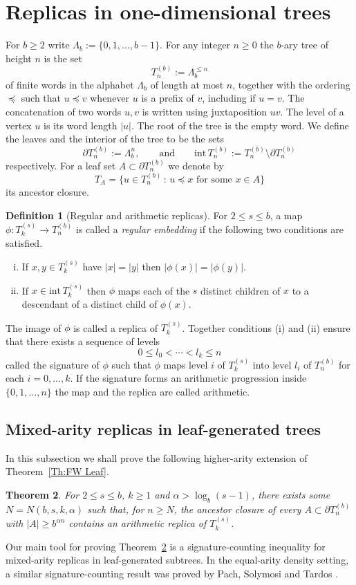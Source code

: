 \documentclass[11pt]{amsart}
\newcommand\labs[1]{\left\lvert#1\right\rvert}
\newcommand{\inte}{\mathrm{int}\,}
\renewcommand{\leq}{\leqslant}
\renewcommand{\geq}{\geqslant}
\theoremstyle{plain}
\newtheorem{thm}{Theorem}[section]
\theoremstyle{definition}
\newtheorem{defn}[thm]{Definition}
\theoremstyle{remark}
\begin{document}
\section{Replicas in one-dimensional trees}
For $b\geq 2$ write $\Lambda_b:=\{0,1,\ldots,b-1\}$. For any integer $n\geq 0$ the $b$-ary tree of height $n$ is the set
\[ T_n^{(b)} := \Lambda_b^{\leq n}\]
of finite words in the alphabet $\Lambda_b$ of length at most $n$, together with the ordering $\preceq$ such that $u\preceq v$ whenever $u$ is a prefix of $v$, including if $u=v$. The concatenation of two words $u,v$ is written using juxtaposition $uv$. The level of a vertex $u$ is its word length $\labs{u}$. The root of the tree is the empty word. We define the leaves and the interior of the tree to be the sets
\[\qquad  \partial T_n^{(b)} := \Lambda_b^{n},\qquad \text{and} \qquad \inte T_n^{(b)} := T_n^{(b)} \setminus \partial T_n^{(b)}\]  
respectively. For a leaf set $A\subset \partial T_n^{(b)}$ we denote by
\[ T_A = \{ u \in T_n^{(b)} \, : \, u \preceq x \text{ for some } x\in A\}\]
its ancestor closure.
\begin{defn}[Regular and arithmetic replicas]\label{Defn: Mixed arity replicas}
For $2\leq s \leq b$, a map $\phi: T_k^{(s)} \to T_n^{(b)}$ is called a \textit{regular embedding} if the following two conditions are satisfied.
\begin{enumerate}[(i)]
\item If $x,y\in T_k^{(s)}$ have $\labs{x} = \labs{y}$ then $\labs{\phi(x)} = \labs{\phi(y)}$.
\item If $x \in \inte T_k^{(s)}$ then $\phi$ maps each of the $s$ distinct children of $x$ to a descendant of a distinct child of $\phi(x)$.
\end{enumerate}
The image of $\phi$ is called a replica of $T_k^{(s)}$.
Together conditions (i) and (ii) ensure that there exists a sequence of levels
\[ 0 \leq l_0 < \cdots < l_k \leq n\]
called the signature of $\phi$ such that $\phi$ maps level $i$ of $T_k^{(s)}$ into level $l_i$ of $T_n^{(b)}$ for each $i=0,\ldots,k$. If the signature forms an arithmetic progression inside $\{0,1,\ldots,n\}$ the map and the replica are called arithmetic.
\end{defn}
\subsection{Mixed-arity replicas in leaf-generated trees}
In this subsection we shall prove the following higher-arity extension of Theorem~\ref{Th:FW Leaf}.
\begin{thm}\label{Thm: Mixed arity FW}
For $2\leq s \leq b$, $k\geq 1$ and $\alpha > \log_b(s-1)$, there exists some $N=N(b,s,k,\alpha)$ such that, for $n\geq N$, the ancestor closure of every $A\subset \partial T_n^{(b)}$ with $\labs{A} \geq b^{\alpha n}$ contains an arithmetic replica of $T_k^{(s)}$.
\end{thm}
Our main tool for proving Theorem~\ref{Thm: Mixed arity FW} is a signature-counting inequality for mixed-arity replicas in leaf-generated subtrees. In the equal-arity density setting, a similar signature-counting result was proved by Pach, Solymosi and Tardos \cite[Lemma 3']{PST}.
\end{document}
